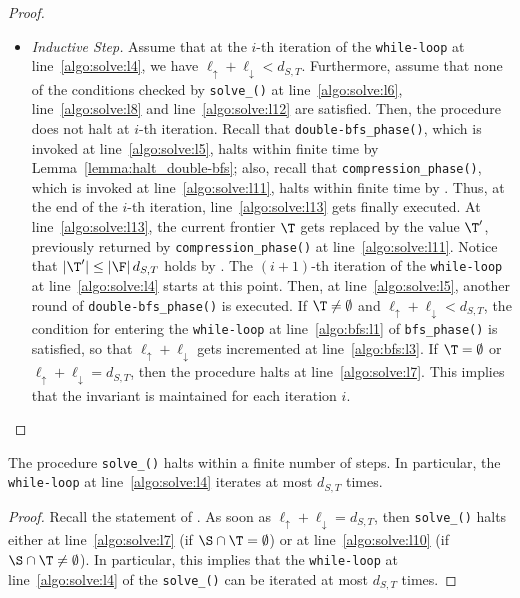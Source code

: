 \begin{proof}
\begin{itemize}
\item \emph{Inductive Step.}
Assume that at the $i$-th iteration of the \texttt{while-loop} at line~\ref{algo:solve:l4},
we have $\ell_\uparrow + \ell_\downarrow < d_{S,T}$. Furthermore, assume that none of the conditions
checked by \texttt{solve\_{\mainproblem}()} at line~\ref{algo:solve:l6},
line~\ref{algo:solve:l8} and line~\ref{algo:solve:l12} are satisfied.
Then, the procedure does not halt at $i$-th iteration.
Recall that \texttt{double-bfs\_phase()}, which is invoked at line~\ref{algo:solve:l5},
halts within finite time by Lemma~\ref{lemma:halt_double-bfs};
also, recall that \texttt{compression\_phase()}, which is invoked at line~\ref{algo:solve:l11},
halts within finite time by .
Thus, at the end of the $i$-th iteration, line~\ref{algo:solve:l13} gets finally executed.
At line~\ref{algo:solve:l13}, the current frontier $\T$ gets replaced by the value $\T'$,
previously returned by \texttt{compression\_phase()} at line~\ref{algo:solve:l11}.
Notice that $|\T'| \leq |\F|\, d_{S,T}$ holds by .
The $(i+1)$-th iteration of the \texttt{while-loop} at line~\ref{algo:solve:l4} starts at this point.
Then, at line~\ref{algo:solve:l5}, another round of \texttt{double-bfs\_phase()} is executed.
If $\T\neq\emptyset$ and $\ell_\uparrow+\ell_\downarrow<d_{S,T}$,
the condition for entering the \texttt{while-loop} at line~\ref{algo:bfs:l1} of \texttt{bfs\_phase()} is satisfied,
so that $\ell_\uparrow+\ell_\downarrow$ gets incremented at line~\ref{algo:bfs:l3}.
If $\T=\emptyset$ or $\ell_{\uparrow}+\ell_\downarrow=d_{S,T}$,
then the procedure halts at line~\ref{algo:solve:l7}.
This implies that the invariant is maintained for each iteration $i$.
\end{itemize}
\end{proof}

\begin{proposition}\label{prop:solve_halts_finite}
The procedure \texttt{solve\_\mainproblem()} halts within a finite number of steps.
In particular, the \texttt{while-loop} at line~\ref{algo:solve:l4} iterates at most $d_{S,T}$ times.
\end{proposition}
\begin{proof}
Recall the statement of . As soon as $\ell_\uparrow + \ell_\downarrow=d_{S,T}$,
then \texttt{solve\_\mainproblem()} halts either at line~\ref{algo:solve:l7}
(if $\S\cap\T=\emptyset$) or at line~\ref{algo:solve:l10} (if $\S\cap\T\neq\emptyset$).
In particular, this implies that the \texttt{while-loop} at line~\ref{algo:solve:l4} of
the \texttt{solve\_\mainproblem()} can be iterated at most $d_{S,T}$ times.
\end{proof}


